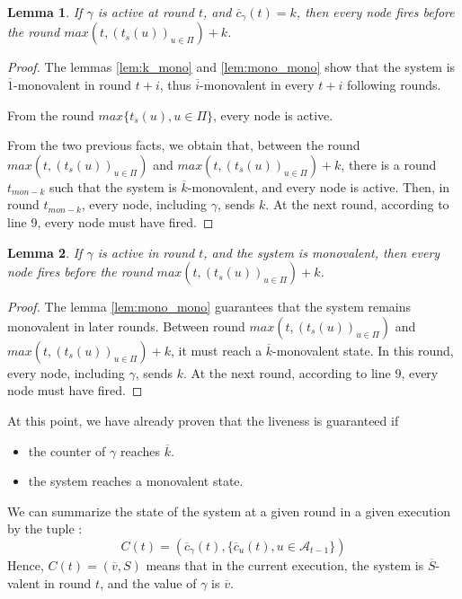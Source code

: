 \documentclass{article}
\newtheorem{lemma}{Lemma}[section]
\newcommand{\cent}{\gamma}
\begin{document}
\begin{lemma}\label{lem:k_liv}
	If $\cent$ is active at round $t$, and $\overline{c}_\cent(t) = k$, then every node fires before the round $max(t, (t_s(u))_{u \in \Pi})+k$.
\end{lemma}
\begin{proof}
	The lemmas \ref{lem:k_mono} and \ref{lem:mono_mono} show that the system is $\overline{1}$-monovalent in round $t+i$,
	thus $\overline{i}$-monovalent in every $t+i$ following rounds.

	From the round $max \{t_s(u), u \in \Pi\}$, every node is active.

	From the two previous facts, we obtain that, between the round $max(t, (t_s(u))_{u \in \Pi})$ and $max(t, (t_s(u))_{u \in \Pi})+k$, there is a round $t_{mon-k}$
	such that the system is $\overline{k}$-monovalent, and every node is active.
	Then, in round $t_{mon-k}$, every node, including $\cent$, sends $k$.
	At the next round, according to line 9, every node must have fired.
\end{proof}
 
\begin{lemma}\label{lem:mono_liv}
	If $\cent$ is active in round $t$, and the system is monovalent, then every node fires before the round $max(t, (t_s(u))_{u \in \Pi})+k$.
\end{lemma}
\begin{proof}
	The lemma \ref{lem:mono_mono} guarantees that the system remains monovalent in later rounds.
	Between round $max(t, (t_s(u))_{u \in \Pi})$ and $max(t, (t_s(u))_{u \in \Pi})+k$, it must reach a $\overline{k}$-monovalent state.
	In this round, every node, including $\cent$, sends $k$.
	At the next round, according to line 9, every node must have fired.
\end{proof}

\noindent At this point, we have already proven that the liveness is guaranteed if
\begin{itemize}
	\item the counter of $\cent$ reaches $\overline{k}$.
	\item the system reaches a monovalent state.
\end{itemize}

\noindent We can summarize the state of the system at a given round in a given execution by the tuple : 
$$C(t) = (\overline{c}_\cent(t), \{\overline{c}_u(t), u \in \mathcal{A}_{t-1}\})$$
Hence, $C(t) = (\overline{v}, S)$ means that in the current execution, the system is $\overline{S}$-valent in round $t$, and the value of $\cent$ is $\overline{v}$.
\end{document}
